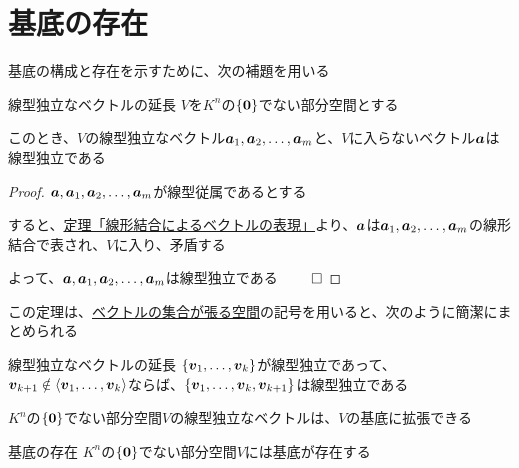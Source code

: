 \documentclass[../../../topic_linear-algebra]{subfiles}
\begin{document}
\sectionline
\section{基底の存在}

基底の構成と存在を示すために、次の補題を用いる

\begin{theorem}{線型独立なベクトルの延長}\label{thm:extend-indep-outside-subspace}
  $V$を$K^n$の$\{\vb*{0} \}$でない部分空間とする

  このとき、$V$の線型独立なベクトル$\vb*{a}_1, \vb*{a}_2, \dots, \vb*{a}_m$と、$V$に入らないベクトル$\vb*{a}$は線型独立である
\end{theorem}

\begin{proof}
  $\vb*{a}, \vb*{a}_1, \vb*{a}_2, \dots, \vb*{a}_m$が線型従属であるとする

  すると、\hyperref[thm:dep-vec-is-lincomb]{定理「線形結合によるベクトルの表現」}より、$\vb*{a}$は$\vb*{a}_1, \vb*{a}_2, \dots, \vb*{a}_m$の線形結合で表され、$V$に入り、矛盾する

  よって、$\vb*{a}, \vb*{a}_1, \vb*{a}_2, \dots, \vb*{a}_m$は線型独立である $\qed$
\end{proof}

この定理は、\hyperref[def:span-of-vectors]{ベクトルの集合が張る空間}の記号を用いると、次のように簡潔にまとめられる

\begin{theorem}{線型独立なベクトルの延長}
  $\{ \vb*{v}_1, \dots, \vb*{v}_k \}$が線型独立であって、$\vb*{v}_{k+1} \notin \langle \vb*{v}_1, \dots, \vb*{v}_k \rangle$ならば、$\{ \vb*{v}_1, \dots, \vb*{v}_k, \vb*{v}_{k+1} \}$は線型独立である
\end{theorem}

\sectionline

$K^n$の$\{\vb*{0} \}$でない部分空間$V$の線型独立なベクトルは、$V$の基底に拡張できる

\begin{theorem}{基底の存在}
  $K^n$の$\{\vb*{0} \}$でない部分空間$V$には基底が存在する
\end{theorem}
\end{document}

